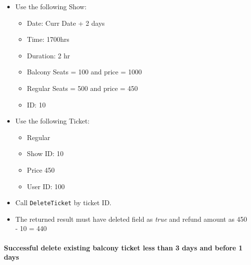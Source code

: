 \documentclass[]{article}
\providecommand{\tightlist}{%
  \setlength{\itemsep}{0pt}\setlength{\parskip}{0pt}}
\let\oldparagraph\paragraph
\renewcommand{\paragraph}[1]{\oldparagraph{#1}\mbox{}}
\begin{document}
\begin{itemize}
\tightlist
\item
  Use the following Show:

  \begin{itemize}
  \tightlist
  \item
    Date: Curr Date + 2 days
  \item
    Time: 1700hrs
  \item
    Duration: 2 hr
  \item
    Balcony Seats = 100 and price = 1000
  \item
    Regular Seats = 500 and price = 450
  \item
    ID: 10
  \end{itemize}
\item
  Use the following Ticket:

  \begin{itemize}
  \tightlist
  \item
    Regular
  \item
    Show ID: 10
  \item
    Price 450
  \item
    User ID: 100
  \end{itemize}
\item
  Call \texttt{DeleteTicket} by ticket ID.
\item
  The returned result must have deleted field as \emph{true} and refund
  amount as 450 - 10 = 440
\end{itemize}

\hypertarget{successful-delete-existing-balcony-ticket-less-than-3-days-and-before-1-days}{%
\paragraph{Successful delete existing balcony ticket less than 3 days
and before 1
days}\label{successful-delete-existing-balcony-ticket-less-than-3-days-and-before-1-days}}
\end{document}
